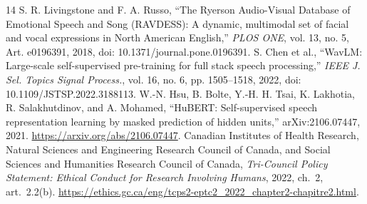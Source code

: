 \documentclass[letterpaper]{article}
\begin{document}
\begin{thebibliography}{14}
 S. R. Livingstone and F. A. Russo, ``The Ryerson Audio-Visual Database of Emotional Speech and Song (RAVDESS): A dynamic, multimodal set of facial and vocal expressions in North American English,'' \emph{PLOS ONE}, vol. 13, no. 5, Art. e0196391, 2018, doi: 10.1371/journal.pone.0196391.
 S. Chen et al., ``WavLM: Large-scale self-supervised pre-training for full stack speech processing,'' \emph{IEEE J. Sel. Topics Signal Process.}, vol. 16, no. 6, pp. 1505--1518, 2022, doi: 10.1109/JSTSP.2022.3188113.
 W.-N. Hsu, B. Bolte, Y.-H. H. Tsai, K. Lakhotia, R. Salakhutdinov, and A. Mohamed, ``HuBERT: Self-supervised speech representation learning by masked prediction of hidden units,'' arXiv:2106.07447, 2021. \url{https://arxiv.org/abs/2106.07447}.
 Canadian Institutes of Health Research, Natural Sciences and Engineering Research Council of Canada, and Social Sciences and Humanities Research Council of Canada, \emph{Tri-Council Policy Statement: Ethical Conduct for Research Involving Humans}, 2022, ch.~2, art.~2.2(b). \url{https://ethics.gc.ca/eng/tcps2-eptc2_2022_chapter2-chapitre2.html}.
\end{thebibliography}
\end{document}
